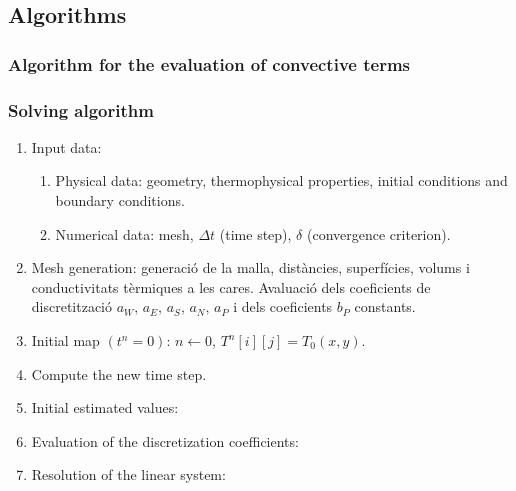 
\subsection{Algorithms}

\subsubsection{Algorithm for the evaluation of convective terms}

\subsubsection{Solving algorithm}

\begin{algorithm}[h]
	\caption{}
	\label{algorithm:algoritme_resolucio_2}
	\begin{algorithmic}[0]
		\State 
		\begin{enumerate}[label=\textbf{\arabic*},topsep=0pt]
			\item Input data:
			\begin{enumerate}[label=\textbf{1.\arabic*}]
				\item Physical data: geometry, thermophysical properties, initial conditions and boundary conditions.
				\item Numerical data: mesh, $\Delta t$ (time step), $\delta$ (convergence criterion).
			\end{enumerate}
			\item Mesh generation: generació de la malla, distàncies, superfícies, volums i conductivitats tèrmiques a les cares. Avaluació dels coeficients de discretització $a_W, \, a_E, \, a_S, \, a_N, \, a_P$ i dels coeficients $b_P$ constants.
			\item Initial map $(t^n = 0)$: $n \gets 0$, $T^n[i][j] = T_0(x,y)$.
			\item Compute the new time step. \label{enum:algoritme2_4}
			\item Initial estimated values:
			\item Evaluation of the discretization coefficients:
			\item Resolution of the linear system:
		\end{enumerate}
	\end{algorithmic}
\end{algorithm}



